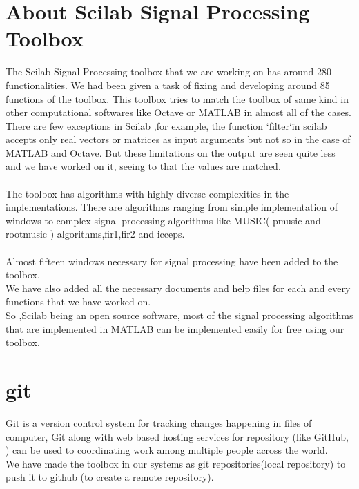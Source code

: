 \documentclass[12pt,a4paper]{report}
\begin{document}
\section{About Scilab Signal Processing Toolbox}
The Scilab Signal Processing toolbox that we are working on has around 280 functionalities. We had been given a task of fixing and developing around 85 functions of the toolbox. 
This toolbox tries to match the toolbox of same kind in other computational softwares like Octave or MATLAB in almost all of the cases. There are few exceptions in Scilab ,for example, the function \char`\"filter\char`\" in scilab accepts only real vectors or matrices as input arguments but not so in the case of MATLAB and Octave. But these limitations on the output are seen quite less and we have worked on it, seeing to that the values are matched. \\
\\
The toolbox has algorithms with highly diverse complexities in the implementations. There are algorithms ranging from simple implementation of windows to complex signal processing algorithms like MUSIC( pmusic and rootmusic ) algorithms,fir1,fir2 and icceps.
\\
\\
Almost fifteen windows necessary for signal processing have been added to the toolbox.\\
We have also added all the necessary documents and help files for each and every functions that we have worked on.\\
So ,Scilab being an open source software, most of the signal processing algorithms that are implemented in MATLAB can be implemented easily for free using our toolbox.  


\section{git}
Git is a version control system for tracking changes happening in files of computer, Git along with web based hosting services for repository (like GitHub, ) can be used to coordinating work among multiple people across the world.\\
We have made the toolbox in our systems as git repositories(local repository) to push it to github (to create a remote repository).
\end{document}

